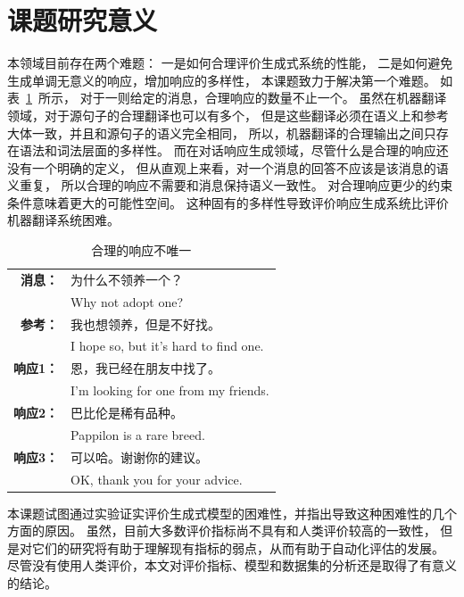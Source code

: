 \section{课题研究意义}\label{sec:research_meaning}
本领域目前存在两个难题：
一是如何合理评价生成式系统的性能，
二是如何避免生成单调无意义的响应，增加响应的多样性，
本课题致力于解决第一个难题。
如表~\ref{tab:multiple_valid_responses}~所示，
对于一则给定的消息，合理响应的数量不止一个。
虽然在机器翻译领域，对于源句子的合理翻译也可以有多个，
但是这些翻译必须在语义上和参考大体一致，并且和源句子的语义完全相同，
所以，机器翻译的合理输出之间只存在语法和词法层面的多样性。
而在对话响应生成领域，尽管什么是合理的响应还没有一个明确的定义，
但从直观上来看，对一个消息的回答不应该是该消息的语义重复，
所以合理的响应不需要和消息保持语义一致性。
对合理响应更少的约束条件意味着更大的可能性空间。
这种固有的多样性导致评价响应生成系统比评价机器翻译系统困难。
\begin{table}
    \centering
    \caption{合理的响应不唯一}
    \label{tab:multiple_valid_responses}
    \begin{tabular}{rl}
        \toprule
        \textbf{消息：} & 为什么不领养一个？ \\
        & Why not adopt one? \\
        \textbf{参考：} & 我也想领养，但是不好找。 \\
        & I hope so, but it's hard to find one. \\
        \midrule
        \textbf{响应1：} & 恩，我已经在朋友中找了。 \\
        & I'm looking for one from my friends. \\
        \textbf{响应2：} & 巴比伦是稀有品种。 \\
        & Pappilon is a rare breed. \\
        \textbf{响应3：} & 可以哈。谢谢你的建议。 \\
        & OK, thank you for your advice. \\
        \bottomrule
    \end{tabular}
\end{table}

本课题试图通过实验证实评价生成式模型的困难性，并指出导致这种困难性的几个方面的原因。
虽然，目前大多数评价指标尚不具有和人类评价较高的一致性，
但是对它们的研究将有助于理解现有指标的弱点，从而有助于自动化评估的发展。
尽管没有使用人类评价，本文对评价指标、模型和数据集的分析还是取得了有意义的结论。

